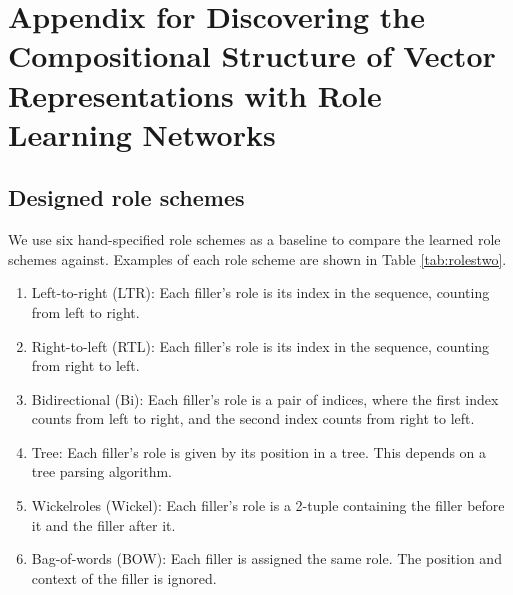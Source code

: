 \appendix 
\makeatletter
{}
\makeatother
\renewcommand{\thechapter}{\Alph{chapter}}

\chapter{Appendix for Discovering the Compositional Structure of Vector Representations with Role Learning Networks} \label{chap:appendix-a}

\section{Designed role schemes} \label{sec:rldn-role-schemes}
We use six hand-specified role schemes as a baseline to compare the learned role schemes against. Examples of each role scheme are shown in Table \ref{tab:rolestwo}.

\begin{enumerate}
	\item Left-to-right (LTR): Each filler's role is its index in the sequence, counting from left to right.
	\item Right-to-left (RTL): Each filler's role is its index in the sequence, counting from right to left.
	\item Bidirectional (Bi): Each filler's role is a pair of indices, where the first index counts from left to right, and the second index counts from right to left.
	\item Tree: Each filler's role is given by its position in a tree. This depends on a tree parsing algorithm.
	\item Wickelroles (Wickel): Each filler's role is a 2-tuple containing the filler before it and the filler after it. \citep{wickelgren1969context}
	\item Bag-of-words (BOW): Each filler is assigned the same role. The position and context of the filler is ignored.
\end{enumerate}


